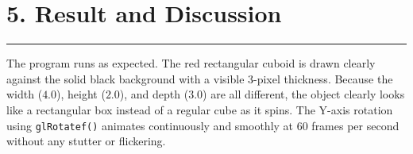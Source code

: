 \documentclass[11pt,a4paper]{article}
\begin{document}
\vspace{0.4cm}
\section*{5. Result and Discussion}
\noindent\rule{\textwidth}{0.6pt}\vspace{0.15cm}

The program runs as expected. The red rectangular cuboid is drawn clearly against the solid black background with a visible 3-pixel thickness. Because the width ($4.0$), height ($2.0$), and depth ($3.0$) are all different, the object clearly looks like a rectangular box instead of a regular cube as it spins. The Y-axis rotation using \texttt{glRotatef()} animates continuously and smoothly at 60 frames per second without any stutter or flickering.
\end{document}
